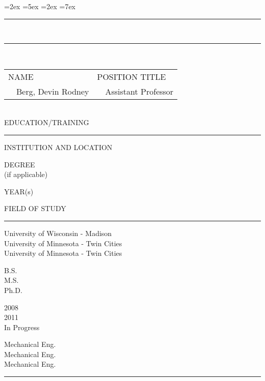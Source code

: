  \textheight=240mm 
 \textwidth=191mm 
 \oddsidemargin=-12mm 
 \evensidemargin=-12mm 
 \topmargin=-17mm 
 \headheight=2ex 
 \headsep=5ex 
 \topskip=0mm 
 \footheight=2ex 
 \footskip=7ex 
 \raggedbottom 
 
 \parindent=0pt 
 \clearpage 
 \pagestyle{myheadings} 
 \vspace*{-12mm} 
 \hrule 
 {\\ 

\hrule 
 ~\\ 

\begin{tabular}{m{9.1cm}|m{9.1cm}} 
 \hline {\scriptsize \sffamily \hspace{-3mm} NAME} & {\scriptsize 
 \sffamily \hspace{-1mm} POSITION TITLE} \\ 
 \ \ Berg, Devin Rodney & \ \ Assistant Professor \\[3mm] \hline 
 \end{tabular}\\[-2.mm] 

{\scriptsize \sffamily EDUCATION/TRAINING } 

\hrule 
 \parbox[t][.9cm][t]{9.2cm}{\vspace{0mm} \center \scriptsize \sffamily 
 INSTITUTION AND LOCATION} \vline{} 
 \parbox[t][.9cm][t]{2.2cm}{\vspace{-2mm}\center \scriptsize \sffamily 
 DEGREE \\ (if applicable)} \vline{} 
 \parbox[t][.9cm][t]{2.20cm}{\vspace{0mm}\center \scriptsize \sffamily 
 YEAR(s)} \vline{} 
 \parbox[t][.9cm][t]{4.5cm}{\vspace{0mm}\center \scriptsize \sffamily 
 FIELD OF STUDY} 
 \hrule 
 \parbox[t][2.1cm][t]{9.2cm}{ \vspace{2mm} University of Wisconsin - Madison\\ 
 University of Minnesota - Twin Cities\\
 University of Minnesota - Twin Cities} \vline{} 
 \parbox[t][2.1cm][t]{2.2cm}{\vspace{2mm} B.S. \\ M.S. \\ Ph.D.} \vline{} 
 \parbox[t][2.1cm][t]{2.20cm}{\vspace{2mm} 2008 \\ 2011 \\ In Progress} \vline{} 
 \parbox[t][2.1cm][t]{4.5cm}{\vspace{2mm} Mechanical Eng. \\ Mechanical Eng.\\ Mechanical Eng.} 
 \hrule 
 ~\\[-3mm] 

}
